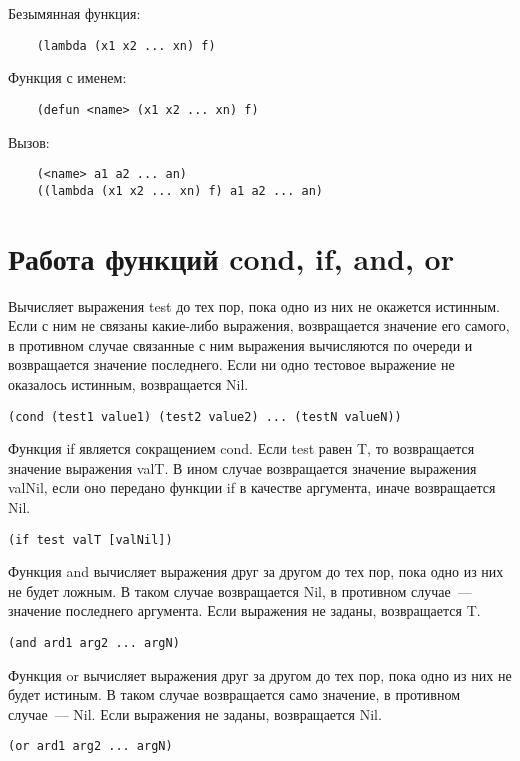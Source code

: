 Безымянная функция:
\begin{lstlisting}
	(lambda (x1 x2 ... xn) f)
\end{lstlisting}

Функция с именем:
\begin{lstlisting}
	(defun <name> (x1 x2 ... xn) f)
\end{lstlisting}

Вызов:
\begin{lstlisting}
	(<name> a1 a2 ... an)
	((lambda (x1 x2 ... xn) f) a1 a2 ... an)
\end{lstlisting}

\section{Работа функций cond, if, and, or}

Вычисляет выражения test до тех пор, пока одно из них не окажется истинным.
Если с ним не связаны какие-либо выражения, возвращается значение его самого, в противном случае связанные с ним выражения вычисляются по очереди и возвращается значение последнего. Если ни одно тестовое выражение не оказалось истинным, возвращается Nil.
\begin{lstlisting}
(cond (test1 value1) (test2 value2) ... (testN valueN))
\end{lstlisting}

Функция if является сокращением cond.
Если test равен T, то возвращается значение выражения valT.
В ином случае возвращается значение выражения valNil, если оно передано функции if в качестве аргумента, иначе возвращается Nil.
\begin{lstlisting}
(if test valT [valNil])
\end{lstlisting}

Функция and вычисляет выражения друг за другом до тех пор, пока одно из них не будет ложным.
В таком случае возвращается Nil, в противном случае~--- значение последнего аргумента.
Если выражения не заданы, возвращается T.
\begin{lstlisting}
(and ard1 arg2 ... argN)
\end{lstlisting}

Функция or вычисляет выражения друг за другом до тех пор, пока одно из них не будет истиным.
В таком случае возвращается само значение, в противном случае~--- Nil.
Если выражения не заданы, возвращается Nil.
\begin{lstlisting}
(or ard1 arg2 ... argN)
\end{lstlisting}

\clearpage
